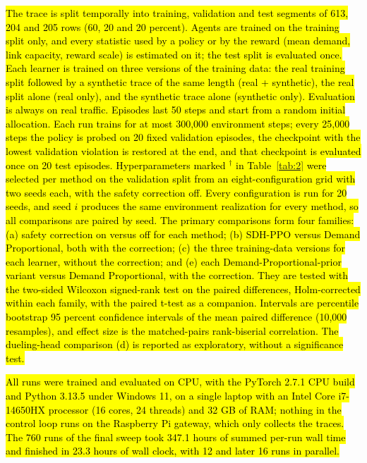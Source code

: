 \documentclass[conference]{IEEEtran}
\newcommand{\rev}[1]{\hl{#1}}
\newcommand{\m}[1]{\mbox{$#1$}}
\begin{document}
\rev{The trace is split temporally into training, validation and test segments of 613, 204 and 205 rows (60, 20 and 20 percent). Agents are trained on the training split only, and every statistic used by a policy or by the reward (mean demand, link capacity, reward scale) is estimated on it; the test split is evaluated once. Each learner is trained on three versions of the training data: the real training split followed by a synthetic trace of the same length (real + synthetic), the real split alone (real only), and the synthetic trace alone (synthetic only). Evaluation is always on real traffic. Episodes last 50 steps and start from a random initial allocation. Each run trains for at most 300,000 environment steps; every 25,000 steps the policy is probed on 20 fixed validation episodes, the checkpoint with the lowest validation violation is restored at the end, and that checkpoint is evaluated once on 20 test episodes. Hyperparameters marked \m{^\dagger} in Table~\ref{tab:2} were selected per method on the validation split from an eight-configuration grid with two seeds each, with the safety correction off. Every configuration is run for 20 seeds, and seed \m{i} produces the same environment realization for every method, so all comparisons are paired by seed. The primary comparisons form four families: (a) safety correction on versus off for each method; (b) SDH-PPO versus Demand Proportional, both with the correction; (c) the three training-data versions for each learner, without the correction; and (e) each Demand-Proportional-prior variant versus Demand Proportional, with the correction. They are tested with the two-sided Wilcoxon signed-rank test on the paired differences, Holm-corrected within each family, with the paired t-test as a companion. Intervals are percentile bootstrap 95 percent confidence intervals of the mean paired difference (10,000 resamples), and effect size is the matched-pairs rank-biserial correlation. The dueling-head comparison (d) is reported as exploratory, without a significance test.}

\rev{All runs were trained and evaluated on CPU, with the PyTorch 2.7.1 CPU build and Python 3.13.5 under Windows 11, on a single laptop with an Intel Core i7-14650HX processor (16 cores, 24 threads) and 32 GB of RAM; nothing in the control loop runs on the Raspberry Pi gateway, which only collects the traces. The 760 runs of the final sweep took 347.1 hours of summed per-run wall time and finished in 23.3 hours of wall clock, with 12 and later 16 runs in parallel.}
\end{document}
